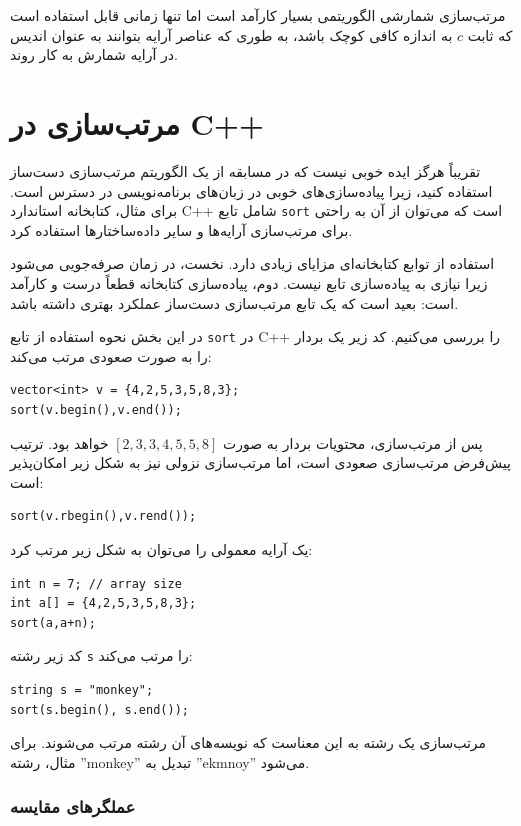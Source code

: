 مرتب‌سازی شمارشی الگوریتمی بسیار کارآمد است
اما تنها زمانی قابل استفاده است که ثابت $c$ به اندازه کافی کوچک باشد،
به طوری که عناصر آرایه بتوانند به عنوان اندیس در آرایه شمارش به کار روند.

\section{مرتب‌سازی در C++}


تقریباً هرگز ایده خوبی نیست که در مسابقه
از یک الگوریتم مرتب‌سازی دست‌ساز
استفاده کنید، زیرا پیاده‌سازی‌های خوبی
در زبان‌های برنامه‌نویسی در دسترس است.
برای مثال، کتابخانه استاندارد C++ شامل
تابع \texttt{sort} است که می‌توان از آن به راحتی برای
مرتب‌سازی آرایه‌ها و سایر داده‌ساختارها استفاده کرد.

استفاده از توابع کتابخانه‌ای مزایای زیادی دارد.
نخست، در زمان صرفه‌جویی می‌شود زیرا نیازی به
پیاده‌سازی تابع نیست.
دوم، پیاده‌سازی کتابخانه
قطعاً درست و کارآمد است: بعید است
که یک تابع مرتب‌سازی دست‌ساز عملکرد بهتری داشته باشد.

در این بخش نحوه استفاده از
تابع \texttt{sort} در C++ را بررسی می‌کنیم.
کد زیر یک بردار را
به صورت صعودی مرتب می‌کند:
\begin{lstlisting}
vector<int> v = {4,2,5,3,5,8,3};
sort(v.begin(),v.end());
\end{lstlisting}
پس از مرتب‌سازی، محتویات بردار
به صورت
$[2,3,3,4,5,5,8]$
خواهد بود.
ترتیب پیش‌فرض مرتب‌سازی صعودی است،
اما مرتب‌سازی نزولی نیز به شکل زیر امکان‌پذیر است:
\begin{lstlisting}
sort(v.rbegin(),v.rend());
\end{lstlisting}
یک آرایه معمولی را می‌توان به شکل زیر مرتب کرد:
\begin{lstlisting}
int n = 7; // array size
int a[] = {4,2,5,3,5,8,3};
sort(a,a+n);
\end{lstlisting}
\newpage
کد زیر رشته \texttt{s} را مرتب می‌کند:
\begin{lstlisting}
string s = "monkey";
sort(s.begin(), s.end());
\end{lstlisting}
مرتب‌سازی یک رشته به این معناست که نویسه‌های
آن رشته مرتب می‌شوند.
برای مثال، رشته ''monkey'' تبدیل به ''ekmnoy'' می‌شود.

\subsubsection{عملگرهای مقایسه}



